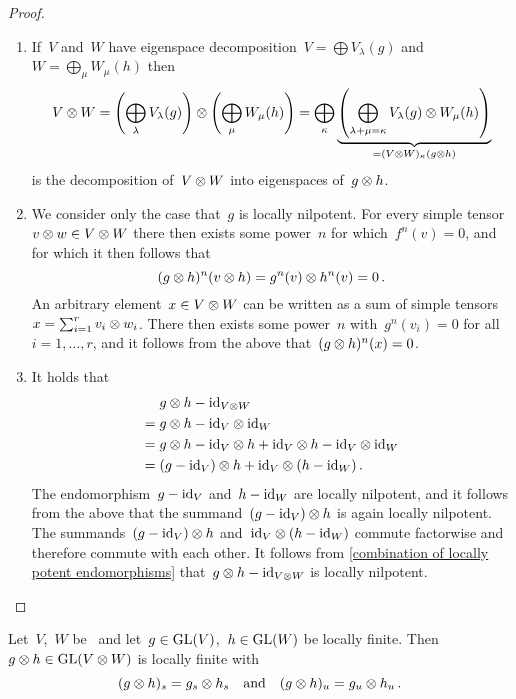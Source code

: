 \begin{proof}
  \leavevmode
  \begin{enumerate}
    \item
      If~$V$ and~$W$ have eigenspace decomposition~$V = \bigoplus V_\lambda(g)$ and~$W = \bigoplus_\mu W_\mu(h)$ then
      \[
          V \otimes W
        =         \left( \bigoplus_\lambda V_\lambda(g) \right)
          \otimes \left( \bigoplus_\mu W_\mu(h) \right)
        = \bigoplus_{\kappa}
          \underbrace{
          \left( \bigoplus_{\lambda + \mu = \kappa} V_\lambda(g) \otimes W_\mu(h) \right)
          }_{= (V \otimes W)_\kappa(g \otimes h)}
      \]
      is the decomposition of~$V \otimes W$ into eigenspaces of~$g \otimes h$.
    \item
      We consider only the case that~$g$ is locally nilpotent.
      For every simple tensor~$v \otimes w \in V \otimes W$ there then exists some power~$n$ for which~$f^n(v) = 0$, and for which it then follows that
      \[
          (g \otimes h)^n(v \otimes h)
        = g^n(v) \otimes h^n(v)
        = 0 \,.
      \]
      An arbitrary element~$x \in V \otimes W$ can be written as a sum of simple tensors~$x = \sum_{i=1}^r v_i \otimes w_i$.
      There then exists some power~$n$ with~$g^n(v_i) = 0$ for all~$i = 1, \dotsc, r$, and it follows from the above that~$(g \otimes h)^n(x) = 0$.
    \item
      It holds that
      \begin{align*}
           &  g \otimes h - \operatorname{id}_{V \otimes W} \\
        ={}&  g \otimes h - {\operatorname{id}_V} \otimes {\operatorname{id}_W} \\
        ={}&  g \otimes h - {\operatorname{id}_V} \otimes h + {\operatorname{id}_V} \otimes h - {\operatorname{id}_V} \otimes {\operatorname{id}_W} \\
        ={}&  (g - \operatorname{id}_V) \otimes h + {\operatorname{id}_V} \otimes (h - \operatorname{id}_W) \,.
      \end{align*}
      The endomorphism~$g - \operatorname{id}_V$ and~$h - \operatorname{id}_W$ are locally nilpotent, and it follows from the above that the summand~$(g - \operatorname{id}_V) \otimes h$ is again locally nilpotent.
      The summands~$(g - \operatorname{id}_V) \otimes h$ and~${\operatorname{id}_V} \otimes (h - \operatorname{id}_W)$ commute factorwise and therefore commute with each other.
      It follows from \cref{combination of locally potent endomorphisms} that~$g \otimes h - \operatorname{id}_{V \otimes W}$ is locally nilpotent.
    \qedhere
  \end{enumerate}
\end{proof}


\begin{lemma}
  Let~$V$,~$W$ be~ and let~$g \in \operatorname{GL}(V)$,~$h \in \operatorname{GL}(W)$ be locally finite.
  Then~$g \otimes h \in \operatorname{GL}(V \otimes W)$ is locally finite with
  \[
      (g \otimes h)_s
    = g_s \otimes h_s
    \quad\text{and}\quad
      (g \otimes h)_u
    = g_u \otimes h_u \,.
  \]
\end{lemma}


